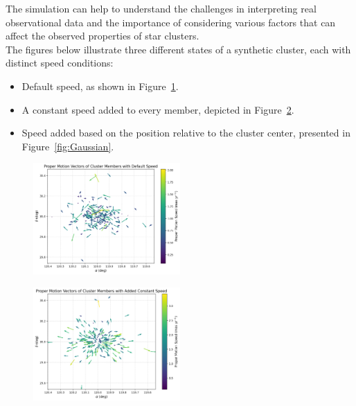 \documentclass{article}
\begin{document}
	The simulation can help to understand the challenges in interpreting real observational data and the importance of considering various factors that can affect the observed properties of star clusters.\\
	
	
The figures below illustrate three different states of a synthetic cluster, each with distinct speed conditions:
\begin{itemize}
	\item Default speed, as shown in Figure~\ref{fig:default}.
	\item A constant speed added to every member, depicted in Figure~\ref{fig:constant}.
	\item Speed added based on the position relative to the cluster center, presented in Figure~\ref{fig:Gaussian}.
\end{itemize}
	\begin{figure}[h] %
		\centering
		\includegraphics[width=0.5\textwidth]{default-speed.png} %
		\caption{} %
		\label{fig:default} %
	\end{figure}
	\begin{figure}[h] %
		\centering
		\includegraphics[width=0.5\textwidth]{constant-speed.png} %
		\caption{} %
		\label{fig:constant} %
	\end{figure}
\end{document}
